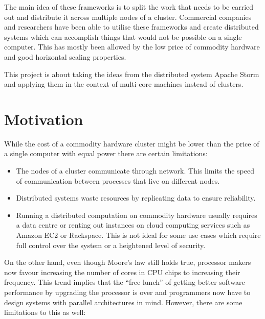 \documentclass[bsc,frontabs,twoside,singlespacing,normalheadings,parskip,logo]{infthesis}     %
\begin{document}
The main idea of these frameworks is to split the work that needs to be carried out and distribute it across multiple nodes of a cluster. Commercial companies and researchers have been able to utilise these frameworks and create distributed systems \cite{5billion-sessions} which can accomplish things that would not be possible on a single computer. This has mostly been allowed by the low price of commodity hardware and good horizontal scaling properties.

This project is about taking the ideas from the distributed system Apache Storm and applying them in the context of multi-core machines instead of clusters.


\section{Motivation}

While the cost of a commodity hardware cluster might be lower than the price of a single computer with equal power there are certain limitations:

\begin{itemize}

\item The nodes of a cluster communicate through network. This limits the speed of communication between processes that live on different nodes.

\item Distributed systems waste resources by replicating data to ensure reliability.

\item Running a distributed computation on commodity hardware usually requires a data centre or renting out instances on cloud computing services such as Amazon EC2 or Rackspace. This is not ideal for some use cases which require full control over the system or a heightened level of security. 

\end{itemize}

On the other hand, even though Moore’s law still holds true, processor makers now favour increasing the number of cores in CPU chips to increasing their frequency. This trend implies that the “free lunch” of getting better software performance by upgrading the processor is over and programmers now have to design systems with parallel architectures in mind. However, there are some limitations to this as well:
\end{document}
